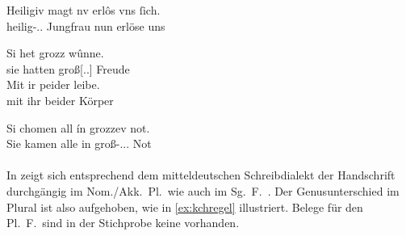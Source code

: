 \begin{exe}
\ex \label{ex:kcmsg}
	\begin{xlist}
	\ex \label{ex:kcmsg_1}
		\gll Heiligiv magt nv erlôs {vns ſich}. \\
			heilig-\Nom.\Sg.\FemF{} Jungfrau nun erlöse uns\footnotemark \\
		\begin{taggedline}{\parencites[\pno~84\ra, 21]{kc:M}[vgl.][11027]{schroeder1895}}
		\trans {}
		\end{taggedline}

	\ex \label{ex:kcmsg_2}
		\gll Si het grozz wûnne. \\
			sie hatten groß[\Acc.\Sg.\FemI] Freude \\
	\sn \gll Mit ir peider leibe. \\
			mit ihr beider Körper \\
		\begin{taggedline}{\parencites%
			[\pno~10\ra, 20--21]{kc:M}[vgl.]%
			[\pno~7\rb, 18--19]{kc:H}%
			[\pno~5\va, 32--33]{kc:B1}%
			[\pno~6\vb, 30--31]{kc:VB}%
			[\pno~6\vb, 11--12]{kc:C1}%
			[\pno~8\ra, 12--13]{kc:K}%
			[1230--1231]{schroeder1895}%
		}
		\trans {}
		\end{taggedline}

	\ex \label{ex:kcmsg_3}
		\gll Si chomen all ín grozzev not. \\
			Sie kamen alle in groß-\Acc.\Sg.\FemI.\St{} Not \\
		\begin{taggedline}{\parencites[\pno~40\va, 2]{kc:M}[vgl.][5384]{schroeder1895}}
		\trans {}
		\end{taggedline}
	\end{xlist}
\end{exe}

\paragraph{\citet{kc:H}}
In \citet{kc:H} zeigt sich entsprechend dem mitteldeutschen Schreibdialekt der
Handschrift durch\-gängig  im Nom./Akk.\ Pl.\ wie auch im Sg.~F.\
\autocite[vgl.][181--184]{ksw2}. Der Genus\-unterschied im Plural ist also
aufgehoben, wie in \cref{ex:kchregel} illustriert. Belege für den Pl.~F.\
sind in der Stichprobe keine vorhanden.

